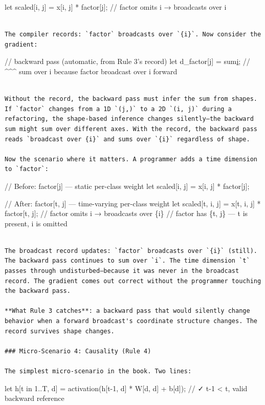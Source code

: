 \documentclass[11pt,titlepage]{article}
\begin{document}
let scaled{[}i, j{]} = x{[}i, j{]} * factor{[}j{]}; // factor omits i →
broadcasts over i

\begin{verbatim}

The compiler records: `factor` broadcasts over `{i}`. Now consider the gradient:
\end{verbatim}

// backward pass (automatic, from Rule 3's record) let d\_factor{[}j{]}
= sum\href{d_scaled\%5Bi,\%20j\%5D\%20*\%20x\%5Bi,\%20j\%5D}{i}; //
\^{}\^{}\^{} sum over i because factor broadcast over i forward

\begin{verbatim}

Without the record, the backward pass must infer the sum from shapes. If `factor` changes from a 1D `(j,)` to a 2D `(i, j)` during a refactoring, the shape-based inference changes silently—the backward sum might sum over different axes. With the record, the backward pass reads `broadcast over {i}` and sums over `{i}` regardless of shape.

Now the scenario where it matters. A programmer adds a time dimension to `factor`:
\end{verbatim}

// Before: factor{[}j{]} --- static per-class weight let scaled{[}i,
j{]} = x{[}i, j{]} * factor{[}j{]};

// After: factor{[}t, j{]} --- time-varying per-class weight let
scaled{[}t, i, j{]} = x{[}t, i, j{]} * factor{[}t, j{]}; // factor omits
i → broadcasts over \{i\} // factor has \{t, j\} --- t is present, i is
omitted

\begin{verbatim}

The broadcast record updates: `factor` broadcasts over `{i}` (still). The backward pass continues to sum over `i`. The time dimension `t` passes through undisturbed—because it was never in the broadcast record. The gradient comes out correct without the programmer touching the backward pass.

**What Rule 3 catches**: a backward pass that would silently change behavior when a forward broadcast's coordinate structure changes. The record survives shape changes.

### Micro-Scenario 4: Causality (Rule 4)

The simplest micro-scenario in the book. Two lines:
\end{verbatim}

let h{[}t in 1..T, d{]} = activation(h{[}t-1, d{]} * W{[}d, d{]} +
b{[}d{]}); // ✓ t-1 \textless{} t, valid backward reference
\end{document}
